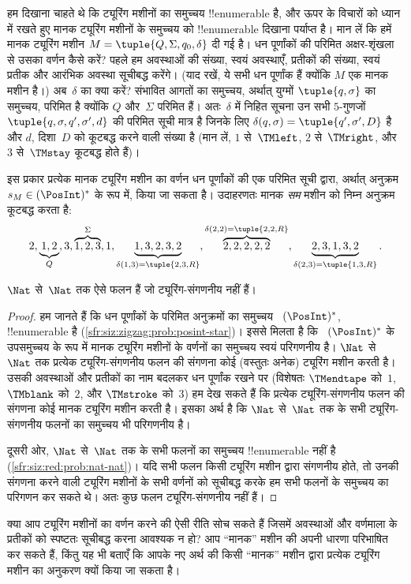 \documentclass[../../../include/open-logic-section]{subfiles}
\begin{document}
\begin{explain}
हम दिखाना चाहते थे कि ट्यूरिंग मशीनों का समुच्चय !!{enumerable} है, और
ऊपर के विचारों को ध्यान में रखते हुए मानक ट्यूरिंग मशीनों के समुच्चय को
!!{enumerable} दिखाना पर्याप्त है। मान लें कि हमें मानक ट्यूरिंग मशीन
$M = \tuple{Q, \Sigma, q_0, \delta}$ दी गई है। धन पूर्णांकों की परिमित
अक्षर-शृंखला से उसका वर्णन कैसे करें? पहले हम अवस्थाओं की संख्या, स्वयं
अवस्थाएँ, प्रतीकों की संख्या, स्वयं प्रतीक और आरंभिक अवस्था सूचीबद्ध
करेंगे। (याद रखें, ये सभी धन पूर्णांक हैं क्योंकि $M$ एक मानक मशीन है।)
अब~$\delta$ का क्या करें? संभावित आगतों का समुच्चय, अर्थात् युग्मों
$\tuple{q,\sigma}$ का समुच्चय, परिमित है क्योंकि $Q$ और~$\Sigma$
परिमित हैं। अतः~$\delta$ में निहित सूचना उन सभी $5$-गुणजों
$\tuple{q, \sigma, q', \sigma', d}$ की परिमित सूची मात्र है जिनके लिए
$\delta(q,\sigma) = \tuple{q', \sigma', D}$ है और $d$, दिशा~$D$ को
कूटबद्ध करने वाली संख्या है (मान लें, $1$ से~$\TMleft$, $2$
से~$\TMright$, और $3$ से~$\TMstay$ कूटबद्ध होते हैं)।

इस प्रकार प्रत्येक मानक ट्यूरिंग मशीन का वर्णन धन पूर्णांकों की एक
परिमित सूची द्वारा, अर्थात् अनुक्रम $s_M \in
(\PosInt)^*$ के रूप में,
किया जा सकता है। उदाहरणतः मानक \emph{सम} मशीन को निम्न अनुक्रम कूटबद्ध
करता है:
\[
2, \underbrace{1, 2}_Q, 3, \overbrace{1, 2, 3}^\Sigma, 1, \underbrace{1, 3, 2, 3, 2}_{\delta(1,3) = \tuple{2,3,R}}, 
\overbrace{2, 2, 2, 2, 2}^{\delta(2,2) = \tuple{2,2,R}},
\underbrace{2, 3, 1, 3, 2}_{\delta(2,3) = \tuple{1,3,R}}.
\]
\end{explain}

\begin{thm}
$\Nat$ से~$\Nat$ तक ऐसे फलन हैं जो ट्यूरिंग-संगणनीय नहीं हैं।
\end{thm}

\begin{proof}
हम जानते हैं कि धन पूर्णांकों के परिमित अनुक्रमों का समुच्चय
~$(\PosInt)^*$, !!{enumerable} है
(\cref{sfr:siz:zigzag:prob:posint-star})। इससे मिलता है कि
~$(\PosInt)^*$ के उपसमुच्चय के रूप में मानक ट्यूरिंग मशीनों के वर्णनों
का समुच्चय स्वयं परिगणनीय है। $\Nat$ से~$\Nat$ तक प्रत्येक
ट्यूरिंग-संगणनीय फलन की संगणना कोई (वस्तुतः अनेक) ट्यूरिंग मशीन करती
है। उसकी अवस्थाओं और प्रतीकों का नाम बदलकर धन पूर्णांक रखने पर (विशेषतः
$\TMendtape$ को~$1$, $\TMblank$ को~$2$, और $\TMstroke$ को~$3$) हम देख
सकते हैं कि प्रत्येक ट्यूरिंग-संगणनीय फलन की संगणना कोई मानक ट्यूरिंग
मशीन करती है। इसका अर्थ है कि $\Nat$ से~$\Nat$ तक के सभी
ट्यूरिंग-संगणनीय फलनों का समुच्चय भी परिगणनीय है।

दूसरी ओर, $\Nat$ से~$\Nat$ तक के सभी फलनों का समुच्चय !!{enumerable}
नहीं है (\cref{sfr:siz:red:prob:nat-nat})। यदि सभी फलन किसी ट्यूरिंग
मशीन द्वारा संगणनीय होते, तो उनकी संगणना करने वाली ट्यूरिंग मशीनों के
सभी वर्णनों को सूचीबद्ध करके हम सभी फलनों के समुच्चय का परिगणन कर सकते
थे। अतः कुछ फलन ट्यूरिंग-संगणनीय नहीं हैं।
\end{proof}

\begin{prob}
  क्या आप ट्यूरिंग मशीनों का वर्णन करने की ऐसी रीति सोच सकते हैं जिसमें
  अवस्थाओं और वर्णमाला के प्रतीकों को स्पष्टतः सूचीबद्ध करना आवश्यक न
  हो? आप ``मानक'' मशीन की अपनी धारणा परिभाषित कर सकते हैं, किंतु यह भी
  बताएँ कि आपके नए अर्थ की किसी ``मानक'' मशीन द्वारा प्रत्येक ट्यूरिंग
  मशीन का अनुकरण क्यों किया जा सकता है।
\end{prob}
\end{document}
